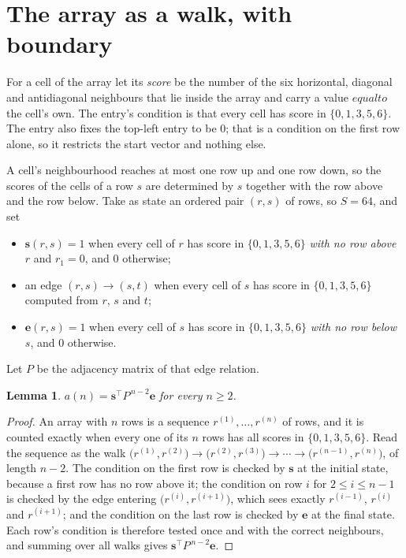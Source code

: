 \documentclass[11pt,a4paper]{article}
\theoremstyle{plain}
\newtheorem{lemma}[theorem]{Lemma}
\theoremstyle{definition}
\begin{document}
\section{The array as a walk, with boundary}

For a cell of the array let its \emph{score} be the number of the six horizontal, diagonal and antidiagonal neighbours that lie inside
the array and carry a value $equal to$ the cell's own. The entry's condition is that every cell
has score in $\{0,1,3,5,6\}$. The entry also fixes the top-left entry to be $0$; that is a condition on the first row alone, so it restricts the start vector and nothing else.

A cell's neighbourhood reaches at most one row up and one row down, so the scores of the
cells of a row $s$ are determined by $s$ together with the row above and the row below.
Take as state an ordered pair $(r,s)$ of rows, so $S=64$, and set
\begin{itemize}
\item $\mathbf{s}(r,s)=1$ when every cell of $r$ has score in $\{0,1,3,5,6\}$ \emph{with no row
above $r$} and $r_1=0$, and $0$ otherwise;
\item an edge $(r,s)\to(s,t)$ when every cell of $s$ has score in $\{0,1,3,5,6\}$ computed from
$r$, $s$ and $t$;
\item $\mathbf{e}(r,s)=1$ when every cell of $s$ has score in $\{0,1,3,5,6\}$ \emph{with no row
below $s$}, and $0$ otherwise.
\end{itemize}
Let $P$ be the adjacency matrix of that edge relation.

\begin{lemma}\label{lem:walk}
$a(n)=\mathbf{s}^{\!\top}P^{\,n-2}\mathbf{e}$ for every $n\ge2$.
\end{lemma}

\begin{proof}
An array with $n$ rows is a sequence $r^{(1)},\dots,r^{(n)}$ of rows, and it is counted
exactly when every one of its $n$ rows has all scores in $\{0,1,3,5,6\}$. Read the sequence as the
walk $\bigl(r^{(1)},r^{(2)}\bigr)\to\bigl(r^{(2)},r^{(3)}\bigr)\to\cdots\to
\bigl(r^{(n-1)},r^{(n)}\bigr)$, of length $n-2$. The condition on the first row is
checked by $\mathbf{s}$ at the initial state, because a first row has no row above it; the
condition on row $i$ for $2\le i\le n-1$ is checked by the edge entering
$\bigl(r^{(i)},r^{(i+1)}\bigr)$, which sees exactly $r^{(i-1)}$, $r^{(i)}$ and
$r^{(i+1)}$; and the condition on the last row is checked by $\mathbf{e}$ at the final
state. Each row's condition is therefore tested once and with the correct neighbours, and
summing over all walks gives $\mathbf{s}^{\!\top}P^{\,n-2}\mathbf{e}$.
\end{proof}
\end{document}
